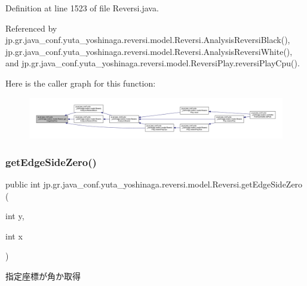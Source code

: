 Definition at line 1523 of file Reversi.\+java.



Referenced by jp.\+gr.\+java\+\_\+conf.\+yuta\+\_\+yoshinaga.\+reversi.\+model.\+Reversi.\+Analysis\+Reversi\+Black(), jp.\+gr.\+java\+\_\+conf.\+yuta\+\_\+yoshinaga.\+reversi.\+model.\+Reversi.\+Analysis\+Reversi\+White(), and jp.\+gr.\+java\+\_\+conf.\+yuta\+\_\+yoshinaga.\+reversi.\+model.\+Reversi\+Play.\+reversi\+Play\+Cpu().

Here is the caller graph for this function\+:\nopagebreak
\begin{figure}[H]
\begin{center}
\leavevmode
\includegraphics[width=350pt]{classjp_1_1gr_1_1java__conf_1_1yuta__yoshinaga_1_1reversi_1_1model_1_1_reversi_afc0b642f56e39a28ab5adc48c8fd2b98_icgraph}
\end{center}
\end{figure}
\mbox{\label{classjp_1_1gr_1_1java__conf_1_1yuta__yoshinaga_1_1reversi_1_1model_1_1_reversi_a3989b051544745724fc372d4a6b8a7f7}} 
\subsubsection{\texorpdfstring{get\+Edge\+Side\+Zero()}{getEdgeSideZero()}}
{\footnotesize\ttfamily public int jp.\+gr.\+java\+\_\+conf.\+yuta\+\_\+yoshinaga.\+reversi.\+model.\+Reversi.\+get\+Edge\+Side\+Zero (\begin{DoxyParamCaption}\item[{int}]{y,  }\item[{int}]{x }\end{DoxyParamCaption})}



指定座標が角か取得 


